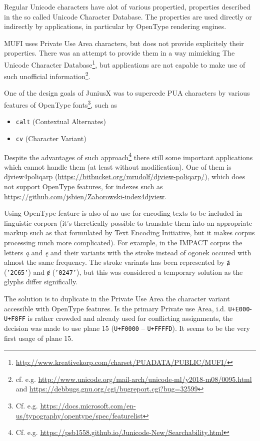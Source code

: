 \documentclass{article}
\newcommand{\pname}[1]{\textsf{#1}}
\newcommand{\uname}[1]{\texttt{'#1'}}
\newcommand{\ucode}[1]{\texttt{U+#1}}
\begin{document}
  Regular Unicode characters have alot of various propertied,
  properties described in the so called Unicode Character
  Database. The properties are used directly or indirectly by
  applications, in particular by OpenType rendering engines.

  MUFI uses Private Use Area characters, but does not provide
  explicitely their properties. There was an attempt to provide them
  in a way mimicking The Unicode Character
  Database\footnote{\url{http://www.kreativekorp.com/charset/PUADATA/PUBLIC/MUFI/}},
  but applications are not capable to make use of such unofficial
  information\footnote{cf. e.g. \url{http://www.unicode.org/mail-arch/unicode-ml/y2018-m08/0095.html}
    and \url{https://debbugs.gnu.org/cgi/bugreport.cgi?bug=32599}}.

  One of the design goals of JuniusX was to supercede PUA characters
  by various features of OpenType
  fonts\footnote{Cf. e.g. \url{https://docs.microsoft.com/en-us/typography/opentype/spec/featurelist}},
  such as
  \begin{itemize}
  \item \texttt{calt} (Contextual Alternates)
  \item \texttt{cv} (Character Variant)
  \end{itemize}
  
  Despite the advantages of such
  approach\footnote{Cf. e.g. \url{https://psb1558.github.io/Junicode-New/Searchability.html}}
  there still some important applications which cannot handle them (at
  least without modification). One of them is \pname{djview4poliqarp}
  (\url{https://bitbucket.org/mrudolf/djview-poliqarp/}), which does
  not support OpenType features, for indexes such as
  \url{https://github.com/jsbien/Zaborowski-index4djview}.

  Using OpenType feature is also of no use for encoding texts to be
  included in linguistic corpora (it's theretically possible to
  translate them into an appropriate markup such as that formulated by
  Text Encoding Initiative, but it makes corpus processing much more
  complicated). For example, in the IMPACT corpus \autocite{bc289} the
  letters \textit{ą} and \textit{ę} and their variants with the stroke
  instead of ogonek occured with almost the same frequency. The stroke
  variants has been represented by {ⱥ} (\uname{2C65}) and {ɇ}
  (\uname{0247}), but this was considered a temporary solution as the
  glyphs differ significally.

  The solution is to duplicate in the Private Use Area the character
  variant accessible with OpenType features. Is the primary Private
  use Area, i.d. \ucode{E000}-\ucode{F8FF} is rather crowded and
  already used for conflicting assignments, the decision was made to
  use plane 15 (\ucode{F0000} – \ucode{FFFFD}). It seems to be the
  very first usage of plane 15.
\end{document}
